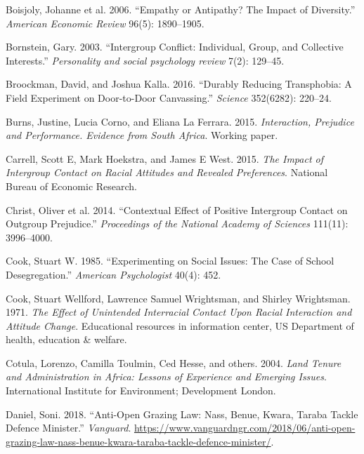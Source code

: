 \documentclass[11pt]{article}
\begin{document}
\leavevmode\hypertarget{ref-boisjoly2006empathy}{}%
Boisjoly, Johanne et al. 2006. ``Empathy or Antipathy? The Impact of
Diversity.'' \emph{American Economic Review} 96(5): 1890--1905.

\leavevmode\hypertarget{ref-bornstein2003intergroup}{}%
Bornstein, Gary. 2003. ``Intergroup Conflict: Individual, Group, and
Collective Interests.'' \emph{Personality and social psychology review}
7(2): 129--45.

\leavevmode\hypertarget{ref-broockman2016durably}{}%
Broockman, David, and Joshua Kalla. 2016. ``Durably Reducing
Transphobia: A Field Experiment on Door-to-Door Canvassing.''
\emph{Science} 352(6282): 220--24.

\leavevmode\hypertarget{ref-burns2015interaction}{}%
Burns, Justine, Lucia Corno, and Eliana La Ferrara. 2015.
\emph{Interaction, Prejudice and Performance. Evidence from South
Africa}. Working paper.

\leavevmode\hypertarget{ref-carrell2015impact}{}%
Carrell, Scott E, Mark Hoekstra, and James E West. 2015. \emph{The
Impact of Intergroup Contact on Racial Attitudes and Revealed
Preferences}. National Bureau of Economic Research.

\leavevmode\hypertarget{ref-christ2014contextual}{}%
Christ, Oliver et al. 2014. ``Contextual Effect of Positive Intergroup
Contact on Outgroup Prejudice.'' \emph{Proceedings of the National
Academy of Sciences} 111(11): 3996--4000.

\leavevmode\hypertarget{ref-cook1985experimenting}{}%
Cook, Stuart W. 1985. ``Experimenting on Social Issues: The Case of
School Desegregation.'' \emph{American Psychologist} 40(4): 452.

\leavevmode\hypertarget{ref-cook1971race}{}%
Cook, Stuart Wellford, Lawrence Samuel Wrightsman, and Shirley
Wrightsman. 1971. \emph{The Effect of Unintended Interracial Contact
Upon Racial Interaction and Attitude Change}. Educational resources in
information center, US Department of health, education \& welfare.

\leavevmode\hypertarget{ref-cotula2004land}{}%
Cotula, Lorenzo, Camilla Toulmin, Ced Hesse, and others. 2004.
\emph{Land Tenure and Administration in Africa: Lessons of Experience
and Emerging Issues}. International Institute for Environment;
Development London.

\leavevmode\hypertarget{ref-daniel2018anti}{}%
Daniel, Soni. 2018. ``Anti-Open Grazing Law: Nass, Benue, Kwara, Taraba
Tackle Defence Minister.'' \emph{Vanguard}.
\url{https://www.vanguardngr.com/2018/06/anti-open-grazing-law-nass-benue-kwara-taraba-tackle-defence-minister/}.
\end{document}
